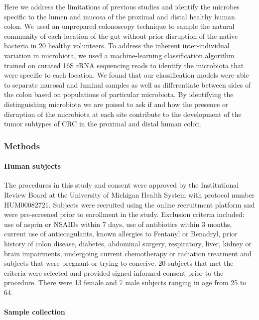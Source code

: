 \documentclass[12pt,]{article}
\let\oldparagraph\paragraph
\renewcommand{\paragraph}[1]{\oldparagraph{#1}\mbox{}}
\begin{document}
Here we address the limitations of previous studies and identify the
microbes specific to the lumen and mucosa of the proximal and distal
healthy human colon. We used an unprepared colonoscopy technique to
sample the natural community of each location of the gut without prior
disruption of the native bacteria in 20 healthy volunteers. To address
the inherent inter-individual variation in microbiota, we used a
machine-learning classification algorithm trained on curated 16S rRNA
sequencing reads to identify the microbiota that were specific to each
location. We found that our classification models were able to separate
mucosal and luminal samples as well as differentiate between sides of
the colon based on populations of particular microbiota. By identifying
the distinguishing microbiota we are poised to ask if and how the
presence or disruption of the microbiota at each site contribute to the
development of the tumor subtypes of CRC in the proximal and distal
human colon.

\subsubsection{Methods}\label{methods}

\paragraph{Human subjects}\label{human-subjects}

The procedures in this study and consent were approved by the
Institutional Review Board at the University of Michigan Health System
with protocol number HUM00082721. Subjects were recruited using the
online recruitment platform and were pre-screened prior to enrollment in
the study. Exclusion criteria included: use of asprin or NSAIDs within 7
days, use of antibiotics within 3 months, current use of anticoagulants,
known allergies to Fentanyl or Benadryl, prior history of colon disease,
diabetes, abdominal surgery, respiratory, liver, kidney or brain
impairments, undergoing current chemotherapy or radiation treatment and
subjects that were pregnant or trying to conceive. 20 subjects that met
the criteria were selected and provided signed informed consent prior to
the procedure. There were 13 female and 7 male subjects ranging in age
from 25 to 64.

\paragraph{Sample collection}\label{sample-collection}
\end{document}
